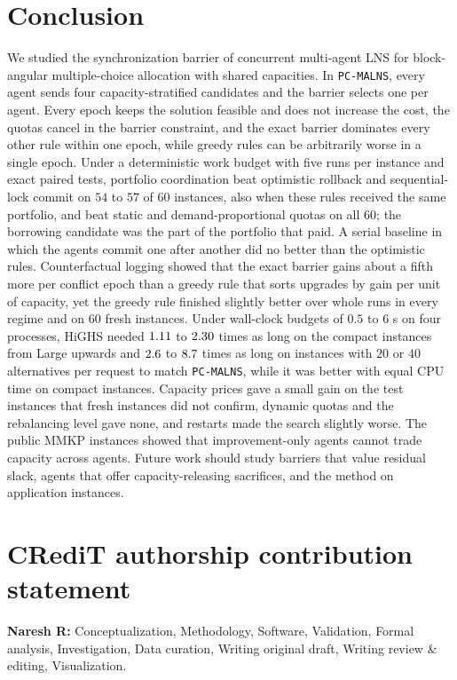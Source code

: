 \documentclass[a4paper,fleqn]{cas-sc}
\newcommand{\pcm}{\texttt{PC-MALNS}}
\begin{document}
\section{Conclusion}
\label{sec:conclusion}
We studied the synchronization barrier of concurrent multi-agent LNS for block-angular multiple-choice allocation with shared capacities. In \pcm, every agent sends four capacity-stratified candidates and the barrier selects one per agent. Every epoch keeps the solution feasible and does not increase the cost, the quotas cancel in the barrier constraint, and the exact barrier dominates every other rule within one epoch, while greedy rules can be arbitrarily worse in a single epoch. Under a deterministic work budget with five runs per instance and exact paired tests, portfolio coordination beat optimistic rollback and sequential-lock commit on $54$ to $57$ of $60$ instances, also when these rules received the same portfolio, and beat static and demand-proportional quotas on all $60$; the borrowing candidate was the part of the portfolio that paid. A serial baseline in which the agents commit one after another did no better than the optimistic rules. Counterfactual logging showed that the exact barrier gains about a fifth more per conflict epoch than a greedy rule that sorts upgrades by gain per unit of capacity, yet the greedy rule finished slightly better over whole runs in every regime and on $60$ fresh instances. Under wall-clock budgets of $0.5$ to $6$ s on four processes, HiGHS needed $1.11$ to $2.30$ times as long on the compact instances from Large upwards and $2.6$ to $8.7$ times as long on instances with $20$ or $40$ alternatives per request to match \pcm, while it was better with equal CPU time on compact instances. Capacity prices gave a small gain on the test instances that fresh instances did not confirm, dynamic quotas and the rebalancing level gave none, and restarts made the search slightly worse. The public MMKP instances showed that improvement-only agents cannot trade capacity across agents. Future work should study barriers that value residual slack, agents that offer capacity-releasing sacrifices, and the method on application instances.

\section*{CRediT authorship contribution statement}
\textbf{Naresh R:} Conceptualization, Methodology, Software, Validation, Formal analysis, Investigation, Data curation, Writing \textendash{} original draft, Writing \textendash{} review \& editing, Visualization.
\end{document}
